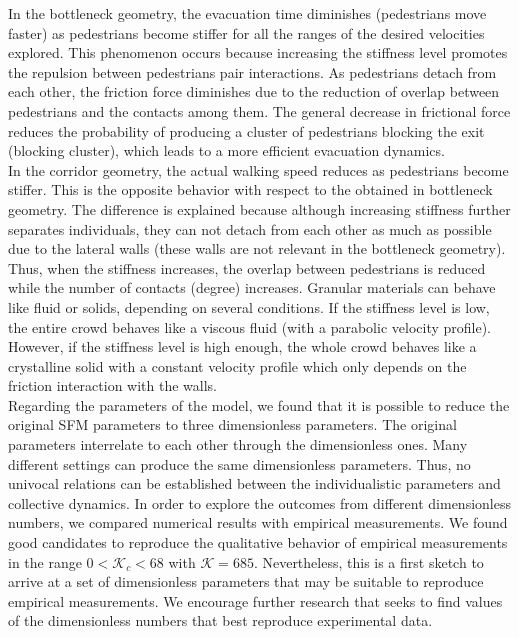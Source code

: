 \documentclass[preprint,12pt]{elsarticle}
\begin{document}
In the bottleneck geometry, the evacuation time diminishes (pedestrians move faster) as pedestrians become stiffer for all the ranges of the desired velocities explored. This phenomenon occurs because increasing the stiffness level promotes the repulsion between pedestrians pair interactions. As pedestrians detach from each other, the friction force diminishes due to the reduction of overlap between pedestrians and the contacts among them. The general decrease in frictional force reduces the probability of producing a cluster of pedestrians blocking the exit (blocking cluster), which leads to a more efficient evacuation dynamics. \\

In the corridor geometry, the actual walking speed reduces as pedestrians become stiffer. This is the opposite behavior with respect to the obtained in bottleneck geometry. The difference is explained because although increasing stiffness further separates individuals, they can not detach from each other as much as possible due to the lateral walls (these walls are not relevant in the bottleneck geometry). Thus, when the stiffness increases, the overlap between pedestrians is reduced while the number of contacts (degree) increases. Granular materials can behave like fluid or solids, depending on several conditions. If the stiffness level is low, the entire crowd behaves like a viscous fluid (with a parabolic velocity profile). However, if the stiffness level is high enough, the whole crowd behaves like a crystalline solid with a constant velocity profile which only depends on the friction interaction with the walls.\\

Regarding the parameters of the model, we found that it is possible to reduce the original SFM parameters to three dimensionless parameters. The original parameters interrelate to each other through the dimensionless ones. Many different settings can produce the same dimensionless parameters. Thus, no univocal relations can be established between the individualistic parameters and collective dynamics. In order to explore the outcomes from different dimensionless numbers, we compared numerical results with empirical measurements. We found good candidates to reproduce the qualitative behavior of empirical measurements in the range $0 < \mathcal{K}_c < 68$ with $\mathcal{K} = 685$. Nevertheless, this is a first sketch to arrive at a set of dimensionless parameters that may be suitable to reproduce empirical measurements. We encourage further research that seeks to find values of the dimensionless numbers that best reproduce experimental data.\\
\end{document}
